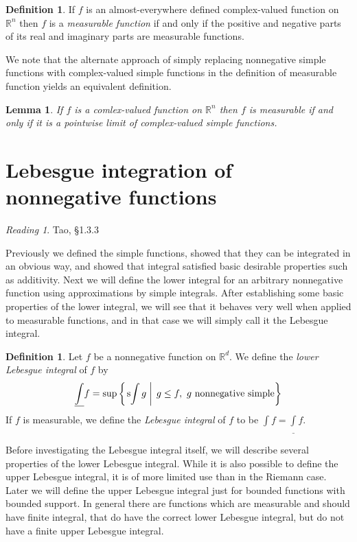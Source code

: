 \documentclass[11pt,oneside]{amsbook}
\newcommand{\RR}{{\mathbb R}}
\newcommand{\lint}{\underline\int}
\theoremstyle{definition}
\theoremstyle{plain}
\newtheorem{lem}[thm]{Lemma}
\theoremstyle{definition}
\newtheorem{defn}[thm]{Definition}
\theoremstyle{remark}
\newtheorem*{reading}{Reading}
\numberwithin{equation}{section}
\numberwithin{figure}{section}
\begin{document}
\begin{defn}
  If $f$ is an almost-everywhere defined complex-valued function on $\RR^n$ then $f$ is a \emph{measurable function} if and only if the positive and negative parts of its real and imaginary parts are measurable functions.
\end{defn}

We note that the alternate approach of simply replacing nonnegative simple functions with complex-valued simple functions in the definition of measurable function yields an equivalent definition.

\begin{lem}
  If $f$ is a comlex-valued function on $\RR^n$ then $f$ is measurable if and only if it is a pointwise limit of complex-valued simple functions.
\end{lem}

\newpage
\section{Lebesgue integration of nonnegative functions}

\begin{reading}
  Tao, \S 1.3.3
\end{reading}

Previously we defined the simple functions, showed that they can be integrated in an obvious way, and showed that integral satisfied basic desirable properties such as additivity. Next we will define the lower integral for an arbitrary nonnegative function using approximations by simple integrals. After establishing some basic properties of the lower integral, we will see that it behaves very well when applied to measurable functions, and in that case we will simply call it the Lebesgue integral.

\begin{defn}
  Let $f$ be a nonnegative function on $\RR^d$. We define the \emph{lower Lebesgue integral} of $f$ by
  \[\underline{\int}f=\sup\left\{\left.\text{s}\kern-2pt\int g\;\right|\; g\leq f,\text{ $g$ nonnegative simple}\right\}
  \]
  If $f$ is measurable, we define the \emph{Lebesgue integral} of $f$ to be $\int f=\lint f$.
\end{defn}

Before investigating the Lebesgue integral itself, we will describe several properties of the lower Lebesgue integral. While it is also possible to define the upper Lebesgue integral, it is of more limited use than in the Riemann case. Later we will define the upper Lebesgue integral just for bounded functions with bounded support. In general there are functions which are measurable and should have finite integral, that do have the correct lower Lebesgue integral, but do not have a finite upper Lebesgue integral.
\end{document}
